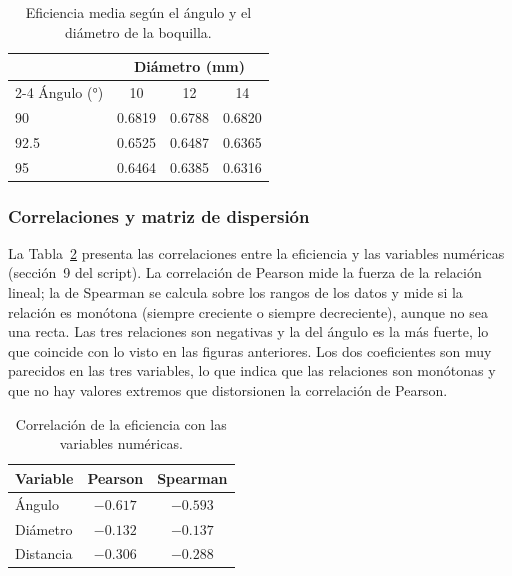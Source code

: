\begin{table}[ht]
\centering
\caption{Eficiencia media según el ángulo y el diámetro de la boquilla.}
\label{tab:angulo_diametro}
\begin{tabular}{lccc}
\toprule
 & \multicolumn{3}{c}{Diámetro (mm)} \\
\cmidrule(lr){2-4}
Ángulo (°) & 10 & 12 & 14 \\
\midrule
90   & 0.6819 & 0.6788 & 0.6820 \\
92.5 & 0.6525 & 0.6487 & 0.6365 \\
95   & 0.6464 & 0.6385 & 0.6316 \\
\bottomrule
\end{tabular}
\end{table}

\subsubsection{Correlaciones y matriz de dispersión}

La Tabla~\ref{tab:correlaciones} presenta las correlaciones entre la eficiencia y las variables numéricas (sección~9 del script). La correlación de Pearson mide la fuerza de la relación lineal; la de Spearman se calcula sobre los rangos de los datos y mide si la relación es monótona (siempre creciente o siempre decreciente), aunque no sea una recta. Las tres relaciones son negativas y la del ángulo es la más fuerte, lo que coincide con lo visto en las figuras anteriores. Los dos coeficientes son muy parecidos en las tres variables, lo que indica que las relaciones son monótonas y que no hay valores extremos que distorsionen la correlación de Pearson.

\begin{table}[ht]
\centering
\caption{Correlación de la eficiencia con las variables numéricas.}
\label{tab:correlaciones}
\begin{tabular}{lcc}
\toprule
Variable & Pearson & Spearman \\
\midrule
Ángulo    & $-0.617$ & $-0.593$ \\
Diámetro  & $-0.132$ & $-0.137$ \\
Distancia & $-0.306$ & $-0.288$ \\
\bottomrule
\end{tabular}
\end{table}


